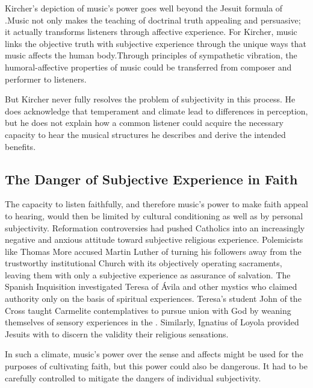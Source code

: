 Kircher's depiction of music's power goes well beyond the Jesuit formula of .
Music not only makes the teaching of doctrinal truth appealing and persuasive; it actually transforms listeners through affective experience.
For Kircher, music links the objective truth with subjective experience through the unique ways that music affects the human body.
Through principles of sympathetic vibration, the humoral-affective properties of music could be transferred from composer and performer to listeners.

But Kircher never fully resolves the problem of subjectivity in this process. 
He does acknowledge that temperament and climate lead to differences in perception, but he does not explain how a common listener could acquire the necessary capacity to hear the musical structures he describes and derive the intended benefits.

\subsection{The Danger of Subjective Experience in Faith}

The capacity to listen faithfully, and therefore music's power to make faith appeal to hearing, would then be limited by cultural conditioning as well as by personal subjectivity.
Reformation controversies had pushed Catholics into an increasingly negative and anxious attitude toward subjective religious experience.
Polemicists like Thomas More accused Martin Luther of turning his followers away from the trustworthy institutional Church with its objectively operating sacraments, leaving them with only a subjective experience as assurance of salvation.%
  \autocite[\XXX, also More]{Schreiner:Certainty}
The Spanish Inquisition investigated Teresa of Ávila and other mystics who claimed authority only on the basis of spiritual experiences.%
  \autocites[\XXX]{Ahlgren:TeresaPolitics}{Francisca:Inquisition}
Teresa's student John of the Cross taught Carmelite contemplatives to pursue union with God by weaning themselves of sensory experiences in the .
Similarly, Ignatius of Loyola provided Jesuits with  to discern the validity their religious sensations.

In such a climate, music's power over the sense and affects might be used for the purposes of cultivating faith, but this power could also be dangerous.
It had to be carefully controlled to mitigate the dangers of individual subjectivity.

